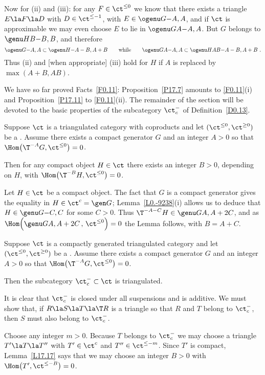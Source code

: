 \documentclass[11pt]{amsart}
\begin{document}
Now for (ii) and (iii): for any $F\in\ct^{\leq0}$ we
know that there exists a triangle $E\la F\la D$ with
$D\in\ct^{\leq-1}$, with $E\in\ogenu G{}{-A,A}$, and if
$\ct$ is approximable we may even choose
$E$ to lie in $\ogenu GA{-A,A}$. But $G$ belongs
to $\genu HB{-B,B}$, and therefore
\[
\ogenu G{}{-A,A}\subset\ogenu H{}{-A-B,A+B}\qquad\text{while}
\qquad \ogenu G{A}{-A,A}\subset\ogenu H{AB}{-A-B,A+B}\ .
\]
Thus (ii) and [when appropriate] (iii) hold for $H$ if $A$
is replaced by $\max(A+B,AB)$.
\eprf

We have so far proved Facts~\ref{F0.11}: Proposition~\ref{P17.7}
amounts to \ref{F0.11}(i) and Proposition~\ref{P17.11}
to \ref{F0.11}(ii). The remainder of the section will be
devoted to the basic properties of the subcategory
$\ct^-_c$ of Definition~\ref{D0.13}.
\ermk




Suppose $\ct$ is a triangulated category with coproducts and
let $(\ct^{\leq0},\ct^{\geq0})$ be a \tstr.
Assume there
exists a compact generator $G$ and an integer $A>0$ so that
$\Hom\big(\T^{-A}G,\ct^{\leq0}\big)=0$.

Then for any compact object $H\in\ct$ there exists an integer
$B>0$, depending on $H$, with
$\Hom\big(\T^{-B}H,\ct^{\leq0}\big)=0$.
\elem

\prf
Let $H\in\ct$ be a compact object.
The fact that $G$ is a compact generator gives
the equality in $H\in\ct^c=\gen G{}$;
Lemma~\ref{L0.-9238}(i) allows us to deduce that
$H\in\genu G{}{-C,C}$ for some $C>0$.
Thus $\T^{-A-C}H\in\genu G{}{A,A+2C}$, and as
$\Hom\Big(\genu
G{}{A,A+2C}\,,\,\ct^{\leq0}\Big)=0$
the Lemma follows, with $B=A+C$.
\eprf


Suppose $\ct$ is a compactly generated triangulated category
 and
let $(\ct^{\leq0},\ct^{\geq0})$ be a \tstr.
Assume there
exists a compact generator $G$ and an integer $A>0$ so that
$\Hom\big(\T^{-A}G,\ct^{\leq0}\big)=0$.

Then the subcategory $\ct^-_c\subset\ct$ is triangulated.
\elem

\prf
It is clear that $\ct^-_c$ is closed under all suspensions and is
additive. We must show that, if $R\la S\la T\la\T R$ is a triangle so
that $R$ and $T$ belong to $\ct^-_c$, then $S$ must also belong to
$\ct^-_c$.

Choose any integer $m>0$. Because $T$ belongs to $\ct^-_c$ we may
choose a triangle $T'\la T\la T''$ with $T'\in\ct^c$ and
$T''\in\ct^{\leq-m}$. Since $T'$ is compact, Lemma~\ref{L17.17} says
that
we may choose an integer $B>0$ with $\Hom\big(T',\ct^{\leq-B}\big)=0$. 
\end{document}
